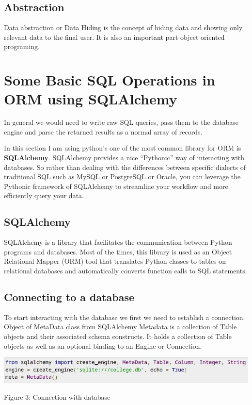 \documentclass[10pt,a4paper,twoside]{article}
\begin{document}
\subsection{Abstraction}
Data abstraction or Data Hiding is the concept of hiding data and showing only relevant data to the final user. It is also an important part object oriented programing.


\section{Some Basic SQL Operations in ORM using SQLAlchemy}
\item In general we would need to write raw SQL queries, pass them to the database engine and parse the returned results as a normal array of records. 
\item In this section I am using python's one of the most common library for ORM is \textbf{SQLAlchemy}. SQLAlchemy provides a nice “Pythonic” way of interacting with databases. So rather than dealing with the differences between specific dialects of traditional SQL such as MySQL or PostgreSQL or Oracle, you can leverage the Pythonic framework of SQLAlchemy to streamline your workflow and more efficiently query your data.

\subsection{SQLAlchemy}
SQLAlchemy is a library that facilitates the communication between Python programs and databases. Most of the times, this library is used as an Object Relational Mapper (ORM) tool that translates Python classes to tables on relational databases and automatically converts function calls to SQL statements.

\subsection{Connecting to a database}
To start interacting with the database we first we need to establish a connection. Object of MetaData class from SQLAlchemy Metadata is a collection of Table objects and their associated schema constructs. It holds a collection of Table objects as well as an optional binding to an Engine or Connection.
\item
\begin{figure3}
  \includegraphics[width=\linewidth]{./images/connection.jpg}
  \vspace{.3cm}
  \caption{ Figure 3: Connection with database}
  \label{fig:Connection with database}
\end{figure3}
\end{document}
